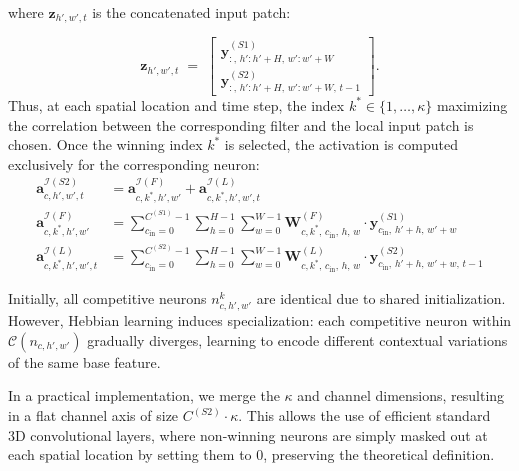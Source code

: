 \documentclass[12pt]{article}
\begin{document}
where $\boldsymbol{z}_{h',w',t}$ is the concatenated input patch:

\begin{equation}
\boldsymbol{z}_{h',w',t} \;=\;
\begin{bmatrix}
\boldsymbol{y}^{(S1)}_{:,\, h':h'+H,\, w':w'+W} \\
\boldsymbol{y}^{(S2)}_{:,\, h':h'+H,\, w':w'+W,\, t-1}
\end{bmatrix}.
\end{equation}
%
Thus, at each spatial location and time step, the index $k^* \in \{1, \dots, \kappa \}$ maximizing the correlation between the corresponding filter and the local input patch is chosen.
Once the winning index $k^*$ is selected, the activation is computed exclusively for the corresponding neuron:
%
\begin{equation}
\begin{aligned}
\boldsymbol{a}^{\mathcal{I}(S2)}_{c, h', w', t} &=
\boldsymbol{a}^{\mathcal{I}(F)}_{c, k^*, h', w'} + \boldsymbol{a}^{\mathcal{I}(L)}_{c, k^*, h', w', t}
\\[1.5ex]
\boldsymbol{a}^{\mathcal{I}(F)}_{c, k^*, h', w'} &= 
\sum_{c_{\text{in}}=0}^{C^{(S1)} - 1} \sum_{h=0}^{H-1} \sum_{w=0}^{W-1}
\boldsymbol{W}^{(F)}_{c,k^*,\, c_{\text{in}},\, h,\, w} \cdot
\boldsymbol{y}^{(S1)}_{c_{\text{in}},\, h'+h,\, w'+w}
\\[1.5ex]
\boldsymbol{a}^{\mathcal{I}(L)}_{c, k^*, h', w', t} &= 
\sum_{c_{\text{in}}=0}^{C^{(S2)} - 1} \sum_{h=0}^{H-1} \sum_{w=0}^{W-1}
\boldsymbol{W}^{(L)}_{c,k^*,\, c_{\text{in}},\, h,\, w} \cdot
\boldsymbol{y}^{(S2)}_{c_{\text{in}},\, h'+h,\, w'+w,\, t-1}
\end{aligned}
\end{equation}

Initially, all competitive neurons $n_{c,h',w'}^k$ are identical due to shared initialization. However, Hebbian learning induces specialization: each competitive neuron within $\mathcal{C} \left( n_{c,h',w'} \right)$ gradually diverges, learning to encode different contextual variations of the same base feature.

In a practical implementation, we merge the $\kappa$ and channel dimensions, resulting in a flat channel axis of size $C^{(S2)} \cdot \kappa$. This allows the use of efficient standard 3D convolutional layers, where non-winning neurons are simply masked out at each spatial location by setting them to $0$, preserving the theoretical definition.
\end{document}
